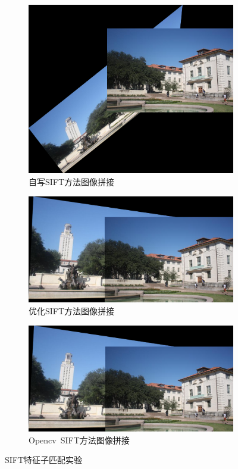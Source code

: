 \documentclass[a4paper, utf8]{ctexart}
\begin{document}
\begin{figure}[htbp]
		\begin{subfigure}{.27\textwidth}
			\centering
			\includegraphics[height=.1\textheight]{./figure/uttower_handon_stitching_sift.png}
			\caption{自写SIFT方法图像拼接}
		\end{subfigure}
		\begin{subfigure}{.35\textwidth}
			\centering
			\includegraphics[height=.1\textheight]{./figure/uttower_handon_stitching_sift_opt.png}
			\caption{优化SIFT方法图像拼接}
		\end{subfigure}
		\begin{subfigure}{.35\textwidth}
			\centering
			\includegraphics[height=.1\textheight]{./figure/uttower_opencv_stitching_sift.png}
			\caption{Opencv\ SIFT方法图像拼接}
		\end{subfigure}
		\caption{SIFT特征子匹配实验}
	\end{figure}
\end{document}
